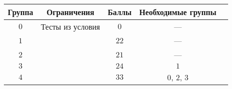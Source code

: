 \begin{center}
\begin{tabular}{|c|c|c|c|c|}
\hline
\textbf{Группа} & \textbf{Ограничения} & \textbf{Баллы} & \textbf{Необходимые группы} \\ \hline
$0$ & Тесты из условия & $0$ & --- \\ \hline
$1$ &  & $22$ & --- \\ \hline
$2$ &  & $21$ & --- \\ \hline
$3$ &  & $24$ & $1$ \\ \hline
$4$ &  & $33$ & $0$, $2$, $3$ \\ \hline
\end{tabular}
\end{center}

